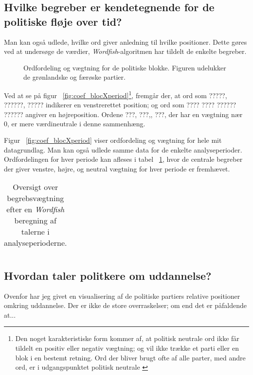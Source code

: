 \subsection{Hvilke begreber er kendetegnende for de politiske fløje over tid?}

Man kan også udlede, hvilke ord giver anledning til hvilke positioner.
Dette gøres ved at undersøge de værdier, \textit{Wordfish}-algoritmen har tildelt de enkelte begreber.

\begin{figure}
\begin{adjustwidth}{-8em}{-8em}
  
\end{adjustwidth}
\caption{Ordfordeling og vægtning for de politiske blokke. Figuren udelukker de grønlandske og færøske partier.}
\label{fig:coef_partyXperiod}
\end{figure}

Ved at se på figur ~\ref{fig:coef_blocXperiod}\footnote{Den noget karakteristiske form kommer af, at politisk neutrale ord ikke får tildelt en positiv eller negativ vægtning; og vil ikke trække et parti eller en blok i en bestemt retning. Ord der bliver brugt ofte af alle parter, med andre ord, er i udgangspunktet politisk neutrale \autocite[s. 709]{slapinScalingModelEstimating2008}}, fremgår der, at ord som ?????, ??????, ????? indikerer en venstrerettet position; og ord som ???? ???? ?????? ?????? angiver en højreposition.
Ordene ???, ???,, ???, der har en vægtning nær 0, er mere værdineutrale i denne sammenhæng.

Figur ~\ref{fig:coef_blocXperiod} viser ordfordeling og vægtning for hele mit datagrundlag.
Man kan også udlede samme data for de enkelte analyseperioder.
Ordfordelingen for hver periode kan afleses i tabel ~\ref{tab:lrterms}, hvor de centrale begreber der giver venstre, højre, og neutral vægtning for hver periode er fremhævet.

\begin{table}
\caption{Oversigt over begrebsvægtning efter en \textit{Wordfish} beregning af talerne i analyseperioderne.}
\label{tab:lrterms}
\begin{adjustwidth}{-9em}{-9em}
\begin{tabular}{lp{2in}p{2in}p{2in}}

\end{tabular}
\end{adjustwidth}
\end{table}

\subsection{Hvordan taler politkere om uddannelse?}
Ovenfor har jeg givet en visualisering af de politiske partiers relative positioner omkring uddannelse.
Der er ikke de store overraskelser; om end det er påfaldende at...

